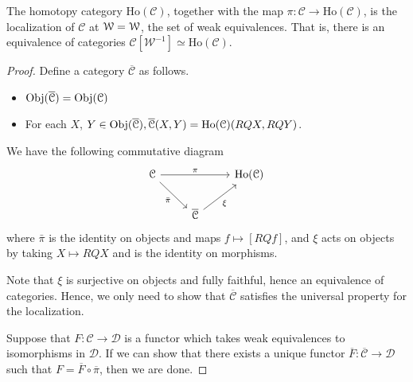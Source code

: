 \documentclass[main.tex]{subfiles}
\begin{document}
\begin{theorem}
  The homotopy category $\mathrm{Ho}(\mathcal{C})$, together with the map $\pi\colon \mathcal{C} \to \mathrm{Ho}(\mathcal{C})$, is the localization of $\mathcal{C}$ at $\mathcal{W} = \mathcal{W}$, the set of weak equivalences. That is, there is an equivalence of categories $\mathcal{C}[\mathcal{W}^{-1}] \simeq \mathrm{Ho}(\mathcal{C})$.
\end{theorem}
\begin{proof}
  Define a category $\overline{\mathcal{C}}$ as follows.
  \begin{itemize}
    \item $\operatorname{Obj}(\overline{\mathcal{C}}) = \operatorname{Obj}(\mathcal{C})$

    \item For each $X$, $Y \in \operatorname{Obj}(\overline{\mathcal{C}}), \overline{\mathcal{C}}(X, Y) = \mathrm{Ho}(\mathcal{C})(RQX, RQY)$.
  \end{itemize}

  We have the following commutative diagram
  \begin{equation*}
    \begin{tikzcd}
      \mathcal{C}
      \arrow[rr, "\pi"]
      \arrow[dr, swap, "\bar{\pi}"]
      && \mathrm{Ho}(\mathcal{C})
      \\
      & \overline{\mathcal{C}}
      \arrow[ur, swap, "\xi"]
    \end{tikzcd}
  \end{equation*}
  where $\bar{\pi}$ is the identity on objects and maps $f \mapsto [RQf]$, and $\xi$ acts on objects by taking $X \mapsto RQX$ and is the identity on morphisms.

  Note that $\xi$ is surjective on objects and fully faithful, hence an equivalence of categories. Hence, we only need to show that $\overline{\mathcal{C}}$ satisfies the universal property for the localization.

  Suppose that $F\colon \mathcal{C} \to \mathcal{D}$ is a functor which takes weak equivalences to isomorphisms in $\mathcal{D}$. If we can show that there exists a unique functor $\overline{F}\colon \overline{\mathcal{C}} \to \mathcal{D}$ such that $F = \overline{F} \circ \overline{\pi}$, then we are done.


\end{proof}
\end{document}

